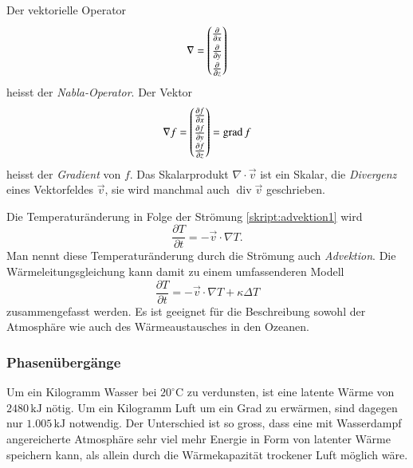\begin{definition}
Der vektorielle Operator 
\[
\nabla
=
\def\arraystretch{1.3}
\begin{pmatrix}
\frac{\partial}{\partial x}\\
\frac{\partial}{\partial y}\\
\frac{\partial}{\partial z}
\end{pmatrix}
\]
heisst der {\em Nabla-Operator}.
Der Vektor
\[
\nabla f
=
\def\arraystretch{1.3}
\begin{pmatrix}
\frac{\partial f}{\partial x}\\
\frac{\partial f}{\partial y}\\
\frac{\partial f}{\partial z}
\end{pmatrix}
=
\operatorname{grad} f
\]
heisst der {\em Gradient} von $f$.
Das Skalarprodukt $\nabla\cdot\vec{v}$ ist ein Skalar, die
{\em Divergenz}
eines Vektorfeldes $\vec{v}$, sie wird manchmal auch
$\operatorname{div}\vec{v}$ geschrieben.
\end{definition}
%
%
%

Die Temperaturänderung in Folge der Strömung 
\eqref{skript:advektion1}
wird 
\begin{equation}
\frac{\partial T}{\partial t}
=
-\vec{v}\cdot\nabla T.
\label{skript:advektion2}
\end{equation}
%
Man nennt diese Temperaturänderung durch die Strömung auch
{\em Advektion}.
Die Wärmeleitungsgleichung kann damit zu einem umfassenderen
Modell
\begin{equation}
\frac{\partial T}{\partial t}
=
-\vec{v}\cdot\nabla T +\kappa\Delta T
\label{skript:waermeleitungadvektion}
\end{equation}
zusammengefasst werden.
Es ist geeignet für die Beschreibung sowohl der Atmosphäre wie auch des
Wärmeaustausches in den Ozeanen.

\subsubsection{Phasenübergänge}
Um ein Kilogramm Wasser bei $20^\circ\text{C}$ zu verdunsten, ist eine
latente Wärme von $2480\,\text{kJ}$ nötig.
%
Um ein Kilogramm Luft um ein Grad zu erwärmen, sind dagegen nur
$1.005\,\text{kJ}$ notwendig.
Der Unterschied ist so gross,
dass eine mit Wasserdampf angereicherte Atmosphäre
sehr viel mehr Energie in Form von latenter Wärme speichern kann, als
allein durch die Wärmekapazität trockener Luft möglich wäre.
%


